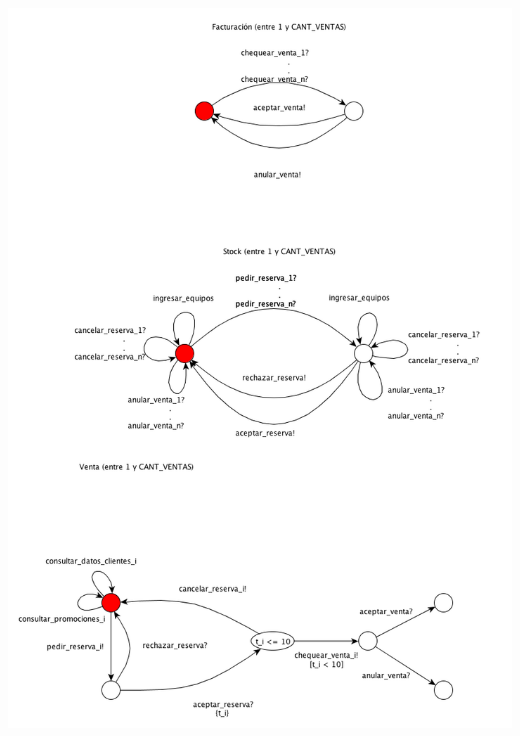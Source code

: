 \begin{center}
\includegraphics[width=16cm]{./imagenes/maquina_de_estado.png}
\end{center}

\clearpage
